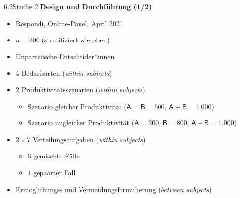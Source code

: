 \documentclass[xcolor=table,9pt,aspectratio=169]{beamer}
\begin{document}
\begin{frame}{\vspace*{10mm}6.2\hspace*{1em}Studie 2}
\textbf{Design und Durchführung (1/2)}\\
\medskip
\begin{itemize}
   \item Respondi, Online-Panel, April 2021
   \item $n=200$ (stratifiziert wie oben)
   \item Unparteiische Entscheider*innen
   \item $4$ Bedarfsarten (\textit{within subjects})
   \item $2$ Produktivitätsszenarien (\textit{within subjects})
   \begin{itemize}
      \item Szenario gleicher Produktivität ($\textsf{A}=\textsf{B}=500$, $\textsf{A}+\textsf{B}=1.000$)
      \item Szenario ungleicher Produktivität ($\textsf{A}=200$, $\textsf{B}=800$, $\textsf{A}+\textsf{B}=1.000$)
   \end{itemize}
   \item $2\times7$ Verteilungsaufgaben (\textit{within subjects})
   \begin{itemize}
      \item $6$ gemischte Fälle
      \item $1$ gepaarter Fall
   \end{itemize}
   \item Ermöglichungs- und Vermeidungsformulierung (\textit{between subjects})
\end{itemize}
\end{frame}
\end{document}
